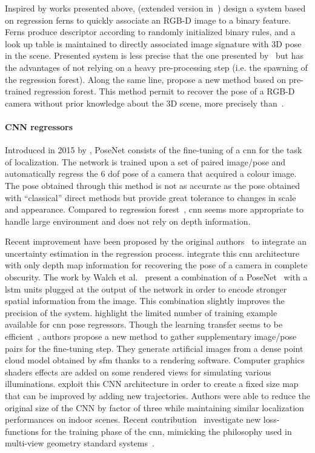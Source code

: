             Inspired by works presented above, \citet{Glocker2013} (extended version in~\citep{Glocker2015}) design a system based on regression ferns to quickly associate an RGB-D image to a binary feature. Ferns produce descriptor according to randomly initialized binary rules, and a look up table is maintained to directly associated image signature with 3D pose in the scene. Presented system is less precise that the one presented by~\citet{Shotton2013} but has the advantages of not relying on a heavy pre-processing step (i.e. the spawning of the regression forest). Along the same line, \citet{Cavallari} propose a new method based on pre-trained regression forest. This method permit to recover the pose of a RGB-D camera without prior knowledge about the 3D scene, more precisely than~\citet{Glocker2013,Glocker2015}.
			

		\paragraph{CNN regressors}
			\label{para:cnn_regressor}
			Introduced in 2015 by \citet{Kendall2015}, PoseNet consists of the fine-tuning of a \ac{cnn} for the task of localization. The network is trained upon a set of paired image/pose and automatically regress the 6 \ac{dof} pose of a camera that acquired a colour image. The pose obtained through this method is not as accurate as the pose obtained with ``classical'' direct methods \citep{Feng2016a,Sattler2016a} but provide great tolerance to changes in scale and appearance. Compared to regression forest~\citep{Valentin2015}, \ac{cnn} seems more appropriate to handle large environment and does not rely on depth information.
			
			Recent improvement have been proposed by the original authors~\citep{Kendall2016} to integrate an uncertainty estimation in the regression process. \citet{Liu2016} integrate this \ac{cnn} architecture with only depth map information for recovering the pose of a camera in complete obscurity. The work by Walch et al.~\citep{Walch2016mastersThesis,Walch2016a} present a combination of a PoseNet~\citep{Kendall2015} with a \ac{lstm} units plugged at the output of the network in order to encode stronger spatial information from the image. This combination slightly improves the precision of the system. \citet{Jia2016} highlight the limited number of training example available for \ac{cnn} pose regressors. Though the learning transfer seems to be efficient~\citep{Kendall2015}, authors propose a new method to gather supplementary image/pose pairs for the fine-tuning step. They generate artificial images from a dense point cloud model obtained by \ac{sfm} thanks to a rendering software. Computer graphics shaders effects are added on some rendered views for simulating various illuminations. \citet{Contreras2017} exploit this CNN architecture in order to create a fixed size map that can be improved by adding new trajectories. Authors were able to reduce the original size of the CNN by factor of three while maintaining similar localization performances on indoor scenes. Recent contribution~\citep{Kendall2017} investigate new loss-functions for the training phase of the \ac{cnn}, mimicking the philosophy used in multi-view geometry standard systems~\citep{Hartley2003}.
			
